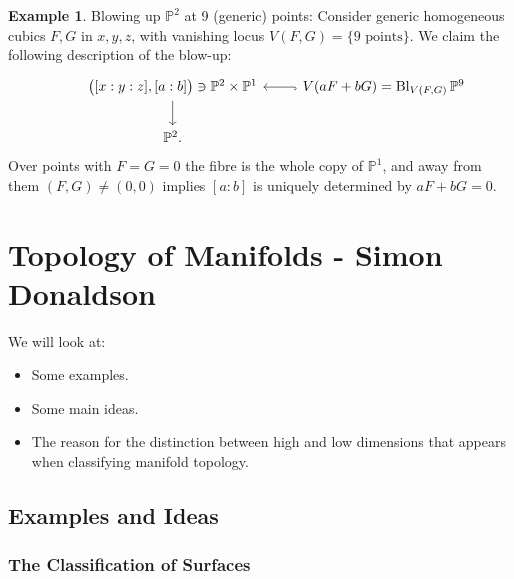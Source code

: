 \documentclass{article}
\theoremstyle{definition}
\newtheorem*{example}{Example}
\DeclareMathOperator{\Bl}{Bl}
\renewcommand{\P}{\mathbb{P}}
\begin{document}
\begin{example}
    Blowing up $\P^2$ at 9 (generic) points: Consider generic homogeneous cubics
    $F,G$ in $x,y,z$, with vanishing locus $V(F,G)=\{\text{9 points}\}$. We
    claim the following description of the blow-up:
    \begin{equation*}
        \begin{tikzcd}
            &\bigl([x:y:z],[a:b]\bigr)\ni\P^2\times\P^1 \ar[d]
            &V(aF+bG)=\Bl_{V(F,G)}\P^9 \ar[l,hook] \\
            &\P^2.
        \end{tikzcd}
    \end{equation*}
    Over points with $F=G=0$ the fibre is the whole copy of $\P^1$, and away
    from them $(F,G)\ne(0,0)$ implies $[a:b]$ is uniquely determined by
    $aF+bG=0$.
\end{example}

\newpage

\section{Topology of Manifolds - Simon Donaldson}

We will look at:
\begin{itemize}
    \item Some examples.
    \item Some main ideas.
    \item The reason for the distinction between high and low dimensions that
        appears when classifying manifold topology.
\end{itemize}

\subsection*{Examples and Ideas}

\subsubsection*{The Classification of Surfaces}
\end{document}
